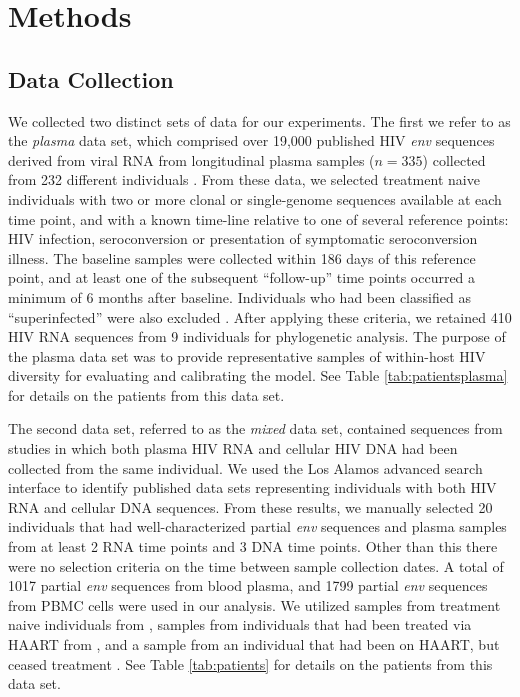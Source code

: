 \documentclass[12pt]{article}
\begin{document}

\section * {Methods} \label{sec:methods}



\subsection * {Data Collection} \label{subsec:dcollection}
We collected two distinct sets of data for our experiments. 
The first we refer to as the {\em plasma} data set, which comprised over 19,000 published HIV \textit{env} sequences derived from viral RNA from longitudinal plasma samples ($n=335$) collected from 232 different individuals \citep{McCloskey14}. 
From these data, we selected treatment naive individuals with two or more clonal or single-genome sequences available at each time point, and with a known time-line relative to one of several reference points: HIV infection, seroconversion or presentation of symptomatic seroconversion illness. 
The baseline samples were collected within 186 days of this reference point, and at least one of the subsequent ``follow-up'' time points occurred a minimum of 6 months after baseline.
Individuals who had been classified as ``superinfected'' were also excluded \citep{McCloskey14}.
After applying these criteria, we retained 410 HIV RNA sequences from 9 individuals for phylogenetic analysis.
The purpose of the plasma data set was to provide representative samples of within-host HIV diversity for evaluating and calibrating the model.
See Table \ref{tab:patientsplasma} for details on the patients from this data set.

The second data set, referred to as the {\em mixed} data set, contained sequences from studies in which both plasma HIV RNA and cellular HIV DNA had been collected from the same individual.
We used the Los Alamos advanced search interface \citep{LosAlamos} to identify published data sets representing individuals with both HIV RNA and cellular DNA sequences.
From these results, we manually selected 20 individuals that had well-characterized partial {\em env} sequences and plasma samples from at least 2 RNA time points and 3 DNA time points. 
Other than this there were no selection criteria on the time between sample collection dates. 
A total of 1017 partial {\em env} sequences from blood plasma, and 1799 partial {\em env} sequences from PBMC cells were used in our analysis. 
We utilized samples from treatment naive individuals from \cite{Shankarappa99, Novitsky09}, samples from individuals that had been treated via HAART from \cite{Llewellyn06}, and a sample from an individual that had been on HAART, but ceased treatment \cite{Fischer04}. 
See Table \ref{tab:patients} for details on the patients from this data set.
\end{document}

